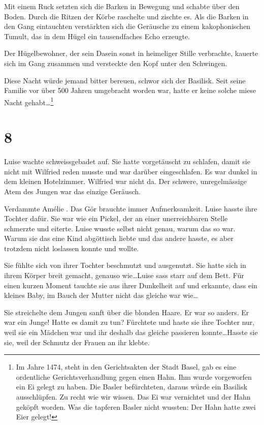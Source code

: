 \documentclass[11pt,titlepage,a5paper]{book}
\newcommand{\am}{Amélie }
\begin{document}
Mit einem Ruck setzten sich die Barken in Bewegung und schabte über den Boden. Durch die Ritzen der Körbe raschelte und zischte es. Als die Barken in den Gang eintauchten verstärkten sich die Geräusche zu einem kakophonischen Tumult, das in dem Hügel ein tausendfaches Echo erzeugte. 

Der Hügelbewohner, der sein Dasein sonst in heimeliger Stille verbrachte, kauerte sich im Gang zusammen und versteckte den Kopf unter den Schwingen. 

Diese Nacht würde jemand bitter bereuen, schwor sich der Basilisk. Seit seine Familie vor über 500 Jahren umgebracht worden war, hatte er keine solche miese Nacht gehabt\dots \footnote{Im Jahre 1474, steht in den Gerichtsakten der Stadt Basel, gab es eine ordentliche Gerichtsverhandlung gegen einen Hahn. Ihm wurde vorgeworfen ein Ei gelegt zu haben. Die Basler befürchteten, daraus würde ein Basilisk ausschlüpfen. Zu recht wie wir wissen. Das Ei war vernichtet und der Hahn geköpft worden. Was die tapferen Basler nicht wussten: Der Hahn hatte zwei Eier gelegt!}

\section*{8}

Luise wachte schweissgebadet auf. Sie hatte vorgetäuscht zu schlafen, damit sie nicht mit Wilfried reden musste und war darüber eingeschlafen. Es war dunkel in dem kleinen Hotelzimmer. Wilfried war nicht da. Der schwere, unregelmässige Atem des Jungen war das einzige Geräusch.

Verdammte \am. Das Gör brauchte immer Aufmerksamkeit. Luise hasste ihre Tochter dafür. Sie war wie ein Pickel, der an einer unerreichbaren Stelle schmerzte und eiterte. Luise wusste selbst nicht genau, warum das so war. Warum sie das eine Kind abgöttisch liebte und das andere hasste, es aber trotzdem nicht loslassen konnte und wollte.

Sie fühlte sich von ihrer Tochter beschmutzt und ausgenutzt. Sie hatte sich in ihrem Körper breit gemacht, genauso wie\dots Luise sass starr auf dem Bett. Für einen kurzen Moment tauchte sie aus ihrer Dunkelheit auf und erkannte, dass ein kleines Baby, im Bauch der Mutter nicht das gleiche war wie\dots

Sie streichelte dem Jungen sanft über die blonden Haare. Er war so anders. Er war ein Junge! Hatte es damit zu tun? Fürchtete und haste sie ihre Tochter nur, weil sie ein Mädchen war und ihr deshalb das gleiche passieren konnte\dots Hasste sie sie, weil der Schmutz der Frauen an ihr klebte.
\end{document}
